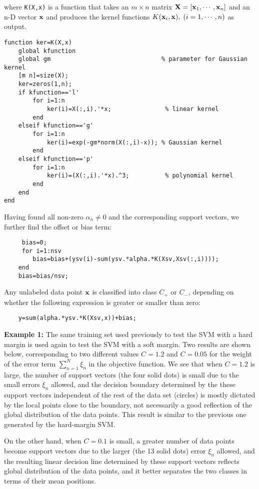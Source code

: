 \documentclass{article}
\begin{document}
where \verb|K(X,x)| is a function that takes an $m\times n$ matrix 
${\bf X}=[{\bf x}_1,\cdots,{\bf x}_n]$ and an n-D vector ${\bf x}$ 
and produces the kernel functions $K({\bf x}_i,{\bf x}),\;(i=1,\cdots,n)$
as output.
\begin{verbatim}
function ker=K(X,x)
    global kfunction
    global gm                               % parameter for Gaussian kernel
    [m n]=size(X);
    ker=zeros(1,n);
    if kfunction=='l'
        for i=1:n
            ker(i)=X(:,i).'*x;               % linear kernel
        end
    elseif kfunction=='g'
        for i=1:n
            ker(i)=exp(-gm*norm(X(:,i)-x)); % Gaussian kernel
        end
    elseif kfunction=='p'
        for i=1:n
            ker(i)=(X(:,i).'*x).^3;          % polynomial kernel
        end
    end
end
\end{verbatim}
Having found all non-zero $\alpha_n\ne 0$ and the corresponding
support vectors, we further find the offset or bias term:
\begin{verbatim}
     bias=0;
     for i=1:nsv
        bias=bias+(ysv(i)-sum(ysv.*alpha.*K(Xsv,Xsv(:,i))));
    end
    bias=bias/nsv;
\end{verbatim}
Any unlabeled data point ${\bf x}$ is classified into class $C_+$ or 
$C_-$, depending on whether the following expression is greater or 
smaller than zero:
\begin{verbatim}
    y=sum(alpha.*ysv.*K(Xsv,x))+bias;
\end{verbatim}

{\bf Example 1:} The same training set used previously to test the SVM
with a hard margin is used again to test the SVM with a soft margin.
Two results are shown below, corresponding to two different values 
$C=1.2$ and $C=0.05$ for the weight of the error term $\sum_{n=1}^N\xi_n$
in the objective function. We see that when $C=1.2$ is large, the number
of support vectors (the four solid dots) is small due to the small errors 
$\xi_n$ allowed, and the decision boundary determined by the these support
vectors independent of the rest of the data set (circles) is mostly
dictated by the local points close to the boundary, not necessarily a
good reflection of the global distribution of the data points. This
result is similar to the previous one generated by the hard-margin SVM. 

On the other hand, when $C=0.1$ is small, a greater number of data points 
become support vectors due to the larger (the 13 solid dots) error $\xi_n$
allowed, and the resulting linear decision line determined by these support
vectors reflects global distribution of the data points, and it better 
separates the two classes in terms of their mean positions.
\end{document}
